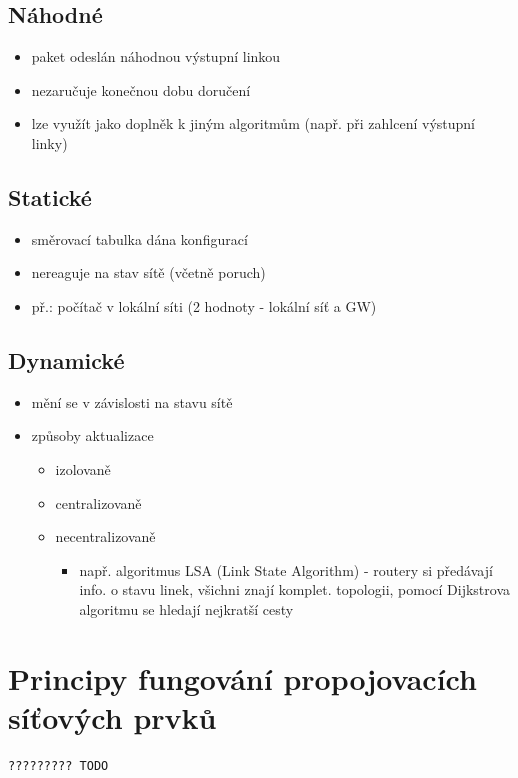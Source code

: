 \documentclass{szzclass}
\providecommand{\tightlist}{%
  \setlength{\itemsep}{0pt}\setlength{\parskip}{0pt}}
\begin{document}
\hypertarget{nuxe1hodnuxe9}{%
\subsection{Náhodné}\label{nuxe1hodnuxe9}}

\begin{itemize}
\tightlist
\item
  paket odeslán náhodnou výstupní linkou
\item
  nezaručuje konečnou dobu doručení
\item
  lze využít jako doplněk k jiným algoritmům (např. při zahlcení
  výstupní linky)
\end{itemize}

\hypertarget{statickuxe9}{%
\subsection{Statické}\label{statickuxe9}}

\begin{itemize}
\tightlist
\item
  směrovací tabulka dána konfigurací
\item
  nereaguje na stav sítě (včetně poruch)
\item
  př.: počítač v lokální síti (2 hodnoty - lokální síť a GW)
\end{itemize}

\hypertarget{dynamickuxe9}{%
\subsection{Dynamické}\label{dynamickuxe9}}

\begin{itemize}
\tightlist
\item
  mění se v závislosti na stavu sítě
\item
  způsoby aktualizace

  \begin{itemize}
  \tightlist
  \item
    izolovaně
  \item
    centralizovaně
  \item
    necentralizovaně

    \begin{itemize}
    \tightlist
    \item
      např. algoritmus LSA (Link State Algorithm) - routery si předávají
      info. o stavu linek, všichni znají komplet. topologii, pomocí
      Dijkstrova algoritmu se hledají nejkratší cesty
    \end{itemize}
  \end{itemize}
\end{itemize}

\hypertarget{principy-fungovuxe1nuxed-propojovacuxedch-suxedux165ovuxfdch-prvkux16f}{%
\section{Principy fungování propojovacích síťových
prvků}\label{principy-fungovuxe1nuxed-propojovacuxedch-suxedux165ovuxfdch-prvkux16f}}

\begin{verbatim}
????????? TODO
\end{verbatim}
\end{document}
